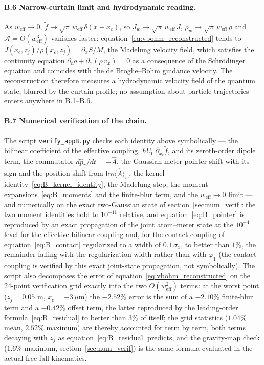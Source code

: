 \documentclass[11pt,a4paper]{article}
\newcommand{\weakval}[1]{\langle #1 \rangle_w}
\begin{document}
\paragraph{B.6 Narrow-curtain limit and hydrodynamic reading.} As $w_\text{eff} \to 0$, $\tilde{f} \to \sqrt{\pi}\,w_\text{eff}\,\delta(x - x_c)$, so $J_w \to \sqrt{\pi}\,w_\text{eff}\,J$, $\rho_w \to \sqrt{\pi}\,w_\text{eff}\,\rho$ and $\mathcal{A} = O(w_\text{eff}^3)$ vanishes faster: equation~\eqref{eq:vbohm_reconstructed} tends to $J(x_c, z_j)/\rho(x_c, z_j) = \partial_x S/M$, the Madelung velocity field, which satisfies the continuity equation $\partial_t\rho + \partial_x(\rho\,v_x) = 0$ as a consequence of the Schr\"odinger equation and coincides with the de Broglie--Bohm guidance velocity. The reconstruction therefore measures a hydrodynamic velocity field of the quantum state, blurred by the curtain profile; no assumption about particle trajectories enters anywhere in B.1--B.6.

\paragraph{B.7 Numerical verification of the chain.} The script \texttt{verify\_appB.py} checks each identity above symbolically --- the bilinear coefficient of the effective coupling, $\hbar U_0\,\partial_{x_c}\tilde{f}$, and its zeroth-order dipole term, the commutator $d\hat{p}_\gamma/dt = -\hat{A}$, the Gaussian-meter pointer shift with its sign and the position shift from $\mathrm{Im}\weakval{\hat{A}}$, the kernel identity~\eqref{eq:B_kernel_identity}, the Madelung step, the moment expansions~\eqref{eq:B_moments} and the finite-blur term, and the $w_\text{eff} \to 0$ limit --- and numerically on the exact two-Gaussian state of section~\ref{sec:num_verif}: the two moment identities hold to $10^{-11}$ relative, and equation~\eqref{eq:B_pointer} is reproduced by an exact propagation of the joint atom--meter state at the $10^{-4}$ level for the effective bilinear coupling and, for the contact coupling of equation~\eqref{eq:B_contact} regularized to a width of $0.1\,\sigma_x$, to better than $1\%$, the remainder falling with the regularization width rather than with $\varphi_1$ (the contact coupling is verified by this exact joint-state propagation, not symbolically). The script also decomposes the error of equation~\eqref{eq:vbohm_reconstructed} on the 24-point verification grid exactly into the two $O(w_\text{eff}^2)$ terms: at the worst point ($z_j = 0.05$ m, $x_c = -3\,\mu$m) the $-2.52\%$ error is the sum of a $-2.10\%$ finite-blur term and a $-0.42\%$ offset term, the latter reproduced by the leading-order formula~\eqref{eq:B_residual} to better than $3\%$ of itself; the grid statistics ($1.04\%$ mean, $2.52\%$ maximum) are thereby accounted for term by term, both terms decaying with $z_j$ as equation~\eqref{eq:B_residual} predicts, and the gravity-map check ($1.6\%$ maximum, section~\ref{sec:num_verif}) is the same formula evaluated in the actual free-fall kinematics.
\end{document}
